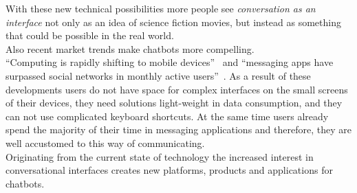 With these new technical possibilities more people see \emph{conversation as an interface} not only as an idea of science fiction movies,
but instead as something that could be possible in the real world.
\\

Also recent market trends make chatbots more compelling.
\\
``Computing is rapidly shifting to mobile devices''~\cite{mobileusage} and ``messaging apps have surpassed social networks in monthly active users''~\cite{convtrends}.
As a result of these developments users do not have space for complex interfaces on the small screens of their devices,
they need solutions light-weight in data consumption, and they can not use complicated keyboard shortcuts.
At the same time users already spend the majority of their time in messaging applications
and therefore, they are well accustomed to this way of communicating.
\\

Originating from the current state of technology the increased interest in conversational interfaces creates new platforms, products and applications for chatbots.
